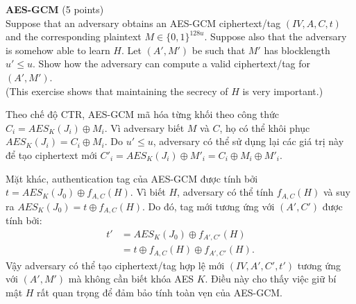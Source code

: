 \begin{problem}{\bf AES-GCM} (5 points)\\
Suppose that an adversary obtains an AES-GCM ciphertext/tag $(IV,A,C,t)$
and the corresponding plaintext $M \in \{0,1\}^{128u}$. Suppose also
that the adversary is somehow able to learn $H$. Let $(A',M')$ be such
that $M'$ has blocklength $u' \leq u$. Show how the adversary can
compute a valid ciphertext/tag for $(A',M')$.\\
(This exercise shows that maintaining the secrecy of $H$ is very important.)
\end{problem}

\begin{loigiai}
Theo chế độ CTR, AES-GCM mã hóa từng khối theo công thức $C_i=AES_K(J_i)\oplus M_i$. Vì adversary biết $M$ và $C$, họ có thể khôi phục $AES_K(J_i)=C_i\oplus M_i$. Do $u'\leq u$, adversary có thể sử dụng lại các giá trị này để tạo ciphertext mới $C'_i=AES_K(J_i)\oplus M'_i=C_i\oplus M_i\oplus M'_i$.

Mặt khác, authentication tag của AES-GCM được tính bởi $t=AES_K(J_0)\oplus f_{A,C}(H)$. Vì biết $H$, adversary có thể tính $f_{A,C}(H)$ và suy ra $AES_K(J_0)=t\oplus f_{A,C}(H)$. Do đó, tag mới tương ứng với $(A',C')$ được tính bởi:
\[
\begin{aligned}
t'&=AES_K(J_0)\oplus f_{A',C'}(H)\\
&=t\oplus f_{A,C}(H)\oplus f_{A',C'}(H).
\end{aligned}
\]
Vậy adversary có thể tạo ciphertext/tag hợp lệ mới $(IV,A',C',t')$ tương ứng với $(A',M')$ mà không cần biết khóa AES $K$. Điều này cho thấy việc giữ bí mật $H$ rất quan trọng để đảm bảo tính toàn vẹn của AES-GCM.
\end{loigiai}
